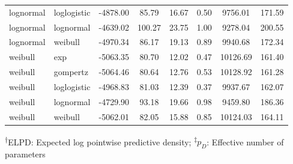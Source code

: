 \documentclass[AMA,STIX1COL]{WileyNJD-v2}
\begin{document}
\begin{table}[H]
\begin{tabular}{l l c c c c c c}
lognormal & loglogistic & -4878.00 & 85.79 & 16.67 & 0.50 & 9756.01 & 171.59\\
lognormal & lognormal & -4639.02 & 100.27 & 23.75 & 1.00 & 9278.04 & 200.55\\
lognormal & weibull & -4970.34 & 86.17 & 19.13 & 0.89 & 9940.68 & 172.34\\
weibull & exp & -5063.35 & 80.70 & 12.02 & 0.47 & 10126.69 & 161.40\\
weibull & gompertz & -5064.46 & 80.64 & 12.76 & 0.53 & 10128.92 & 161.28\\
weibull & loglogistic & -4968.83 & 81.03 & 12.39 & 0.37 & 9937.67 & 162.07\\
weibull & lognormal & -4729.90 & 93.18 & 19.66 & 0.98 & 9459.80 & 186.36\\
weibull & weibull & -5062.01 & 82.05 & 15.88 & 0.85 & 10124.03 & 164.11\\
\bottomrule
\end{tabular}
\begin{tablenotes}%
\textsuperscript{$\dagger$}ELPD: Expected log pointwise predictive density;
\textsuperscript{$\ddagger$}$p_D$: Effective number of parameters
\end{tablenotes}
\end{table}
\end{document}
